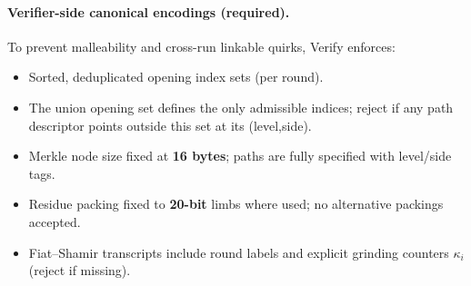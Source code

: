 \paragraph{Verifier-side canonical encodings (required).}
To prevent malleability and cross-run linkable quirks, \textsf{Verify} enforces:
\begin{itemize}[leftmargin=1.25em]
  \item Sorted, deduplicated opening index sets (per round).
  \item The union opening set defines the only admissible indices; reject if any path descriptor points outside this set at its (level,side).
  \item Merkle node size fixed at \textbf{16 bytes}; paths are fully specified with level/side tags.
  \item Residue packing fixed to \textbf{20-bit} limbs where used; no alternative packings accepted.
  \item Fiat–Shamir transcripts include round labels and explicit grinding counters $\kappa_i$ (reject if missing).
\end{itemize}
